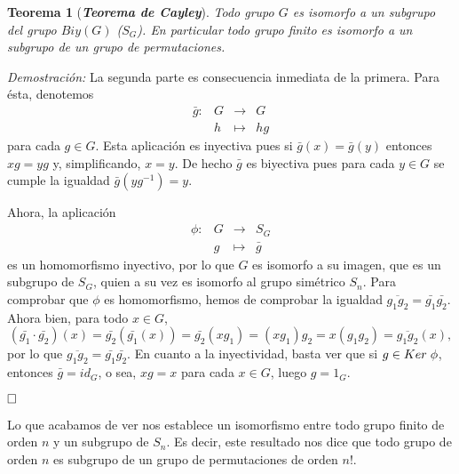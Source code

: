 \documentclass[12pt]{article}
\newtheorem{theorem}{Teorema}[section]
\begin{document}
\begin{theorem}[\textbf{\textit{Teorema de Cayley}}]
Todo grupo $G$ es isomorfo a un subgrupo del grupo $Biy(G)$ ($S_G$). En particular todo grupo finito es isomorfo a un subgrupo de un grupo de permutaciones.
\end{theorem}
\emph{Demostración: } La segunda parte es consecuencia inmediata de la primera. Para ésta, denotemos $$\begin{array}{rccl}
\bar{g} \colon &G& \longrightarrow &G\\
&h& \longmapsto &hg
\end{array}
$$ para cada $g \in G$. Esta aplicación es inyectiva pues si $\bar{g}(x) = \bar{g}(y)$ entonces $xg = yg$ y, simplificando, $x = y$. De hecho $\bar{g}$ es biyectiva pues para cada $y \in G$ se cumple la igualdad $\bar{g}(yg^{-1}) = y.$ 

Ahora, la aplicación $$\begin{array}{rccl}
\phi \colon &G& \longrightarrow &S_{G}\\
&g& \longmapsto &\bar{g}
\end{array}
$$ es un homomorfismo inyectivo, por lo que $G$ es isomorfo a su imagen, que es un subgrupo de $S_{G}$, quien a su vez es isomorfo al grupo simétrico $S_{n}$. Para comprobar que $\phi$ es homomorfismo, hemos de comprobar la igualdad $\overline{g_{1}g_{2}} =  \bar{g_{1}} \bar{g_{2}}$. Ahora bien, para todo $x \in G$, $$(\bar{g_{1}} \cdot \bar{g_{2}}) (x) = \bar{g_{2}}(\bar{g_{1}}(x)) = \bar{g_{2}}(xg_{1}) = (xg_{1})g_{2} = x(g_{1}g_{2}) = \overline{g_{1}g_{2}} (x),$$ por lo que $\overline{g_{1}g_{2}} = \bar{g_{1}} \bar{g_{2}}$. En cuanto a la inyectividad, basta ver que si $g \in Ker\hspace{0.1cm} \phi$, entonces $\bar{g} = id_{G}$, o sea, $xg = x$ para cada $x \in G$, luego $g = 1_{G}$.

$\hfill \square$

Lo que acabamos de ver nos establece un isomorfismo entre todo grupo finito de orden $n$ y un subgrupo de $S_{n}$. Es decir, este resultado nos dice que todo grupo de orden $n$ es subgrupo de un grupo de permutaciones de orden $n!$.
\end{document}
